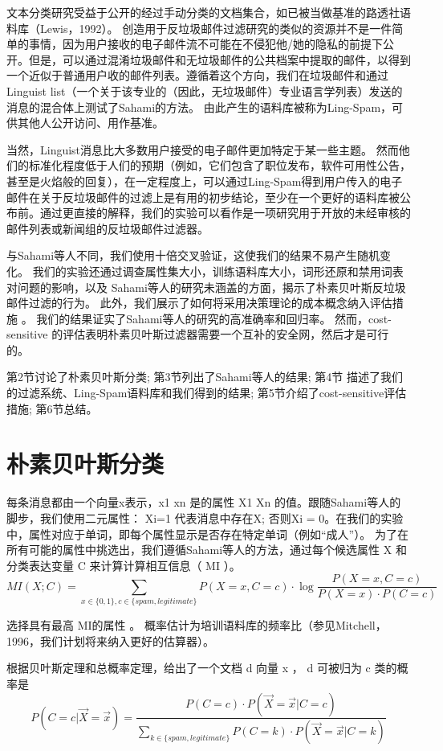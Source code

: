 \documentclass[UTF8]{ctexart}
\begin{document}
文本分类研究受益于公开的经过手动分类的文档集合，如已被当做基准的路透社语料库（Lewis，1992）。 创造用于反垃圾邮件过滤研究的类似的资源并不是一件简单的事情，因为用户接收的电子邮件流不可能在不侵犯他/她的隐私的前提下公开。但是，可以通过混淆垃圾邮件和无垃圾邮件的公共档案中提取的邮件，以得到一个近似于普通用户收的邮件列表。遵循着这个方向，我们在垃圾邮件和通过Linguist list（一个关于该专业的（因此，无垃圾邮件）专业语言学列表）发送的消息的混合体上测试了Sahami的方法。 由此产生的语料库被称为Ling-Spam，可供其他人公开访问、用作基准。 

当然，Linguist消息比大多数用户接受的电子邮件更加特定于某一些主题。 然而他们的标准化程度低于人们的预期（例如，它们包含了职位发布，软件可用性公告，甚至是火焰般的回复），在一定程度上，可以通过Ling-Spam得到用户传入的电子邮件在关于反垃圾邮件的过滤上是有用的初步结论，至少在一个更好的语料库被公布前。通过更直接的解释，我们的实验可以看作是一项研究用于开放的未经审核的邮件列表或新闻组的反垃圾邮件过滤器。 

与Sahami等人不同，我们使用十倍交叉验证，这使我们的结果不易产生随机变化。 我们的实验还通过调查属性集大小，训练语料库大小，词形还原和禁用词表对问题的影响，以及 Sahami等人的研究未涵盖的方面，揭示了朴素贝叶斯反垃圾邮件过滤的行为。 此外，我们展示了如何将采用决策理论的成本概念纳入评估措施 。 我们的结果证实了Sahami等人的研究的高准确率和回归率。 然而，cost-sensitive 的评估表明朴素贝叶斯过滤器需要一个互补的安全网，然后才是可行的。

第2节讨论了朴素贝叶斯分类; 第3节列出了Sahami等人的结果; 第4节 描述了我们的过滤系统、Ling-Spam语料库和我们得到的结果; 第5节介绍了cost-sensitive评估措施; 第6节总结。

\section{朴素贝叶斯分类}
每条消息都由一个向量x表示，x1 xn 是的属性 X1 Xn 的值。跟随Sahami等人的脚步，我们使用二元属性： Xi=1 代表消息中存在X; 否则Xi = 0。在我们的实验中，属性对应于单词，即每个属性显示是否存在特定单词（例如“成人”）。 为了在所有可能的属性中挑选出，我们遵循Sahami等人的方法，通过每个候选属性 X 和分类表达变量 C 来计算计算相互信息（ MI ）。
$$M I(X;C)=\sum_{x \in\{0,1\}, c \in\{spam, legitimate\}} P(X=x, C=c) \cdot \log \frac{P(X=x, C=c)}{P(X=x) \cdot P(C=c)}$$

选择具有最高 MI的属性 。 概率估计为培训语料库的频率比（参见Mitchell，1996，我们计划将来纳入更好的估算器）。

根据贝叶斯定理和总概率定理，给出了一个文档 d 向量 x ， d 可被归为 c 类的概率是
$$P(C=c | \vec{X}=\vec{x})=\frac{P(C=c) \cdot P(\vec{X}=\vec{x} | C=c)}{\sum_{k \in\{spam,legitimate\}} P(C=k) \cdot P(\vec{X}=\vec{x} | C=k)}$$
\end{document}
